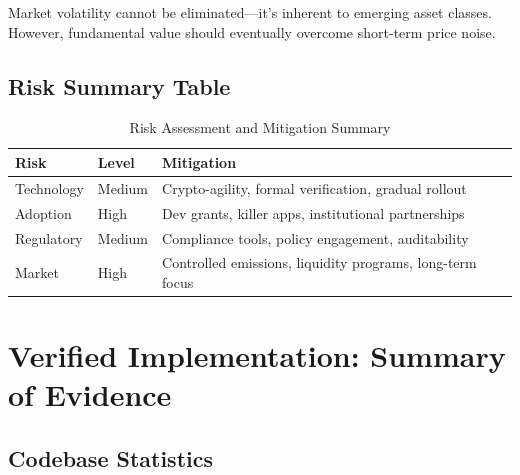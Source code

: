 \documentclass[11pt,a4paper]{article}
\begin{document}
Market volatility cannot be eliminated—it's inherent to emerging asset classes. However, fundamental value should eventually overcome short-term price noise.

\subsection{Risk Summary Table}

\begin{table}[h]
\centering
\begin{tabular}{@{}llp{6cm}@{}}
\toprule
\textbf{Risk} & \textbf{Level} & \textbf{Mitigation} \\ \midrule
Technology & Medium & Crypto-agility, formal verification, gradual rollout \\
Adoption & High & Dev grants, killer apps, institutional partnerships \\
Regulatory & Medium & Compliance tools, policy engagement, auditability \\
Market & High & Controlled emissions, liquidity programs, long-term focus \\
\bottomrule
\end{tabular}
\caption{Risk Assessment and Mitigation Summary}
\end{table}

\newpage
\section{Verified Implementation: Summary of Evidence}

\subsection{Codebase Statistics}
\end{document}
